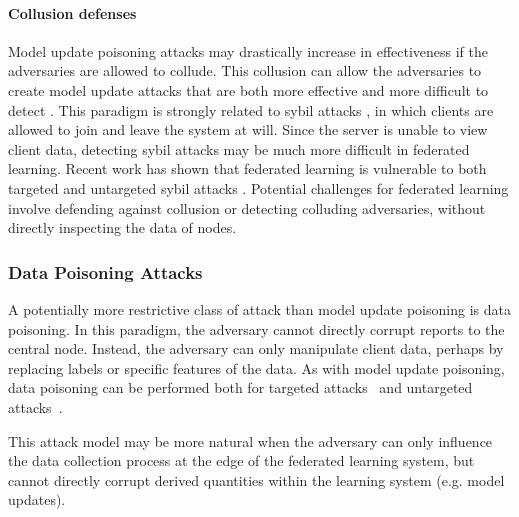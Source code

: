 \documentclass[11pt]{article}
\newcommand{\sketch}[1]{[{\color{darkgreen}{\emph{#1}}}]}
\begin{document}
\paragraph{Collusion defenses} Model update poisoning attacks may drastically increase in effectiveness if the adversaries are allowed to collude. This collusion can allow the adversaries to create model update attacks that are both more effective and more difficult to detect \citep{baruch2019little}. This paradigm is strongly related to sybil attacks \citep{sybil-attack}, in which clients are allowed to join and leave the system at will. Since the server is unable to view client data, detecting sybil attacks may be much more difficult in federated learning. Recent work has shown that federated learning is vulnerable to both targeted and untargeted sybil attacks \citep{fung2018mitigating}. Potential challenges for federated learning involve defending against collusion or detecting colluding adversaries, without directly inspecting the data of nodes.

\subsubsection{Data Poisoning Attacks}
\label{subsubsec:data_poisoning}


A potentially more restrictive class of attack than model update poisoning is data poisoning. In this paradigm, the adversary cannot directly corrupt reports to the central node. Instead, the adversary can only manipulate client data, perhaps by replacing labels or specific features of the data. As with model update poisoning, data poisoning can be performed both for targeted attacks~\citep{Biggio:2012:PAA:3042573.3042761, chen2017targeted, koh2017understanding} and untargeted attacks~\citep{DBLP:conf/ndss/LiuMALZW018, bagdasaryan18backdoor}.

This attack model may be more natural when the adversary can only influence the data collection process at the edge of the federated learning system, but cannot directly corrupt derived quantities within the learning system (e.g. model updates).
\end{document}
